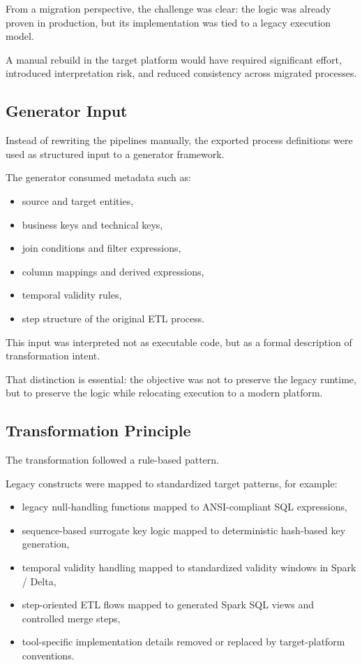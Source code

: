 \documentclass[11pt,a4paper]{article}
\begin{document}
From a migration perspective, the challenge was clear: the logic was already proven in production, but its implementation was tied to a legacy execution model.

A manual rebuild in the target platform would have required significant effort, introduced interpretation risk, and reduced consistency across migrated processes.

\subsection{Generator Input}

Instead of rewriting the pipelines manually, the exported process definitions were used as structured input to a generator framework.

The generator consumed metadata such as:
\begin{itemize}
  \item source and target entities,
  \item business keys and technical keys,
  \item join conditions and filter expressions,
  \item column mappings and derived expressions,
  \item temporal validity rules,
  \item step structure of the original ETL process.
\end{itemize}

This input was interpreted not as executable code, but as a formal description of transformation intent.

That distinction is essential: the objective was not to preserve the legacy runtime, but to preserve the logic while relocating execution to a modern platform.

\subsection{Transformation Principle}

The transformation followed a rule-based pattern.

Legacy constructs were mapped to standardized target patterns, for example:
\begin{itemize}
  \item legacy null-handling functions mapped to ANSI-compliant SQL expressions,
  \item sequence-based surrogate key logic mapped to deterministic hash-based key generation,
  \item temporal validity handling mapped to standardized validity windows in Spark / Delta,
  \item step-oriented ETL flows mapped to generated Spark SQL views and controlled merge steps,
  \item tool-specific implementation details removed or replaced by target-platform conventions.
\end{itemize}
\end{document}
